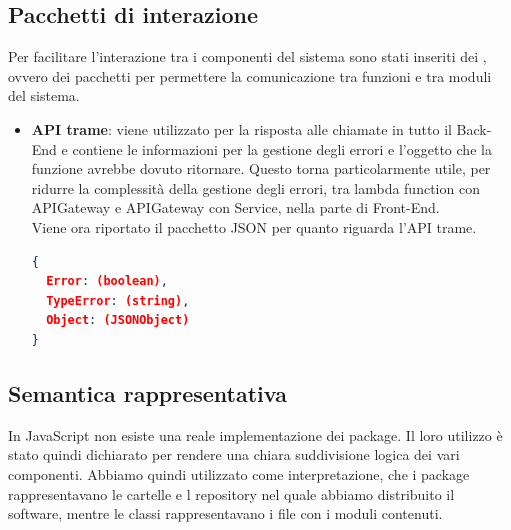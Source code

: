 \documentclass[../DefinizioneDiProdotto_v3.0.0.tex]{subfiles}
\begin{document}
\subsection{Pacchetti di interazione}
Per facilitare l'interazione tra i componenti del sistema sono stati inseriti dei , ovvero dei pacchetti  per permettere la comunicazione tra funzioni e tra moduli del sistema.
\begin{itemize}
	\item \textbf{API trame}: viene utilizzato per la risposta alle chiamate in tutto il Back-End e contiene le informazioni per la gestione degli errori e l'oggetto che la funzione avrebbe dovuto ritornare. Questo torna particolarmente utile, per ridurre la complessità della gestione degli errori, tra lambda function con APIGateway e APIGateway con Service, nella parte di Front-End.\\
	      Viene ora riportato il pacchetto JSON per quanto riguarda l'API trame.
	      \begin{lstlisting}[language=json,firstnumber=1]
{
  Error: (boolean),
  TypeError: (string),
  Object: (JSONObject)
}
	      \end{lstlisting}
\end{itemize}

\subsection{Semantica rappresentativa}
In JavaScript non esiste una reale implementazione dei package. Il loro utilizzo è stato quindi dichiarato per rendere una chiara suddivisione logica dei vari componenti.
Abbiamo quindi utilizzato come interpretazione, che i package rappresentavano le cartelle e l repository nel quale abbiamo distribuito il software, mentre le classi rappresentavano i file con i moduli contenuti.
\end{document}

